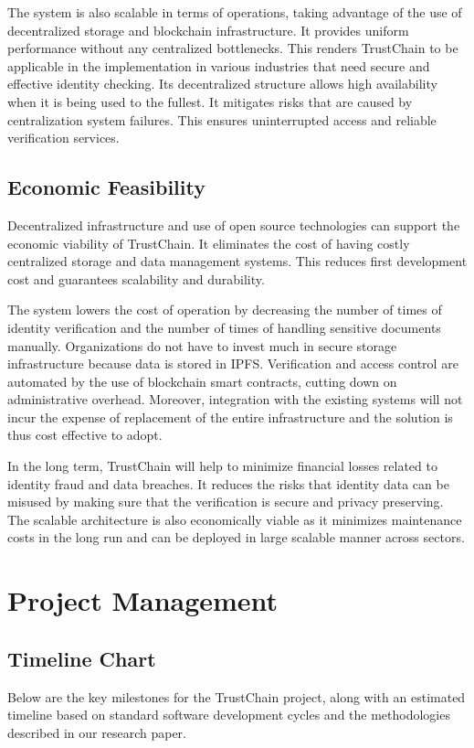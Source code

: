 The system is also scalable in terms of operations, taking advantage of the use of decentralized storage and blockchain infrastructure. It provides uniform performance without any centralized bottlenecks. This renders TrustChain to be applicable in the implementation in various industries that need secure and effective identity checking. Its decentralized structure allows high availability when it is being used to the fullest. It mitigates risks that are caused by centralization system failures. This ensures uninterrupted access and reliable verification services.
\subsection{Economic Feasibility}
Decentralized infrastructure and use of open source technologies can support the economic viability of TrustChain. It eliminates the cost of having costly centralized storage and data management systems. This reduces first development cost and guarantees scalability and durability.

The system lowers the cost of operation by decreasing the number of times of identity verification and the number of times of handling sensitive documents manually. Organizations do not have to invest much in secure storage infrastructure because data is stored in IPFS. Verification and access control are automated by the use of blockchain smart contracts, cutting down on administrative overhead. Moreover, integration with the existing systems will not incur the expense of replacement of the entire infrastructure and the solution is thus cost effective to adopt.

In the long term, TrustChain will help to minimize financial losses related to identity fraud and data breaches. It reduces the risks that identity data can be misused by making sure that the verification is secure and privacy preserving. The scalable architecture is also economically viable as it minimizes maintenance costs in the long run and can be deployed in large scalable manner across sectors.


\section{Project Management}
\subsection{Timeline Chart}
Below are the key milestones for the TrustChain project, along with an estimated timeline based on standard software development cycles and the methodologies described in our research paper.

